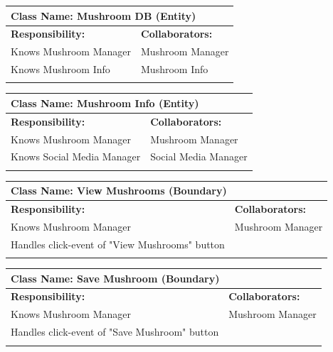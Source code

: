 \documentclass[]{article}
\begin{document}
\begin{itemize}
    \begin{table}[ht]
		\centering
		\begin{tabular}{|p{6cm}|p{6cm}|}
		\hline 
		\multicolumn{2}{|l|}{\textbf{Class Name: Mushroom DB  (Entity)}} \\
		\hline
		\textbf{Responsibility:} & \textbf{Collaborators:} \\
		\hline
		Knows Mushroom Manager & Mushroom Manager\\
		Knows Mushroom Info & Mushroom Info\\
		\vspace{1in} & \\
		\hline
		\end{tabular}
	\end{table}

        \begin{table}[ht]
		\centering
		\begin{tabular}{|p{6cm}|p{6cm}|}
		\hline 
		\multicolumn{2}{|l|}{\textbf{Class Name: Mushroom Info (Entity)}} \\
		\hline
		\textbf{Responsibility:} & \textbf{Collaborators:} \\
		\hline
		Knows Mushroom Manager & Mushroom Manager\\
		Knows Social Media Manager & Social Media Manager\\
		\vspace{1in} & \\
		\hline
		\end{tabular}
	\end{table}

          \begin{table}[ht]
		\centering
		\begin{tabular}{|p{6cm}|p{6cm}|}
		\hline 
		\multicolumn{2}{|l|}{\textbf{Class Name: View Mushrooms (Boundary)}} \\
		\hline
		\textbf{Responsibility:} & \textbf{Collaborators:} \\
		\hline
		Knows Mushroom Manager & Mushroom Manager\\
		Handles click-event of "View Mushrooms" button&\\
		\vspace{1in} & \\
		\hline
		\end{tabular}
	\end{table}

        \begin{table}[ht]
		\centering
		\begin{tabular}{|p{6cm}|p{6cm}|}
		\hline 
		\multicolumn{2}{|l|}{\textbf{Class Name: Save Mushroom (Boundary)}} \\
		\hline
		\textbf{Responsibility:} & \textbf{Collaborators:} \\
		\hline
		Knows Mushroom Manager & Mushroom Manager\\
		Handles click-event of "Save Mushroom" button&\\
		\vspace{1in} & \\
		\hline
		\end{tabular}
	\end{table}


\end{itemize}
\end{document}
